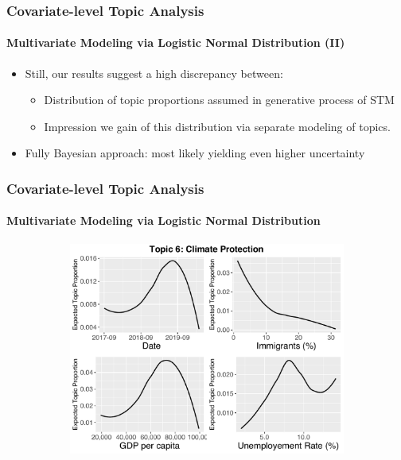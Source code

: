 \documentclass[xcolor=dvipsnames]{beamer}
\begin{document}
\begin{frame}
\frametitle{Covariate-level Topic Analysis}
\framesubtitle{Multivariate Modeling via Logistic Normal Distribution (II)}
\begin{itemize}
\item Still, our results suggest a high discrepancy between:
\begin{itemize}
\item Distribution of topic proportions assumed in generative process of STM
\item Impression we gain of this distribution via separate modeling of topics.
\end{itemize}
\item Fully Bayesian approach: most likely yielding even higher uncertainty
\end{itemize}
\frametitle{Covariate-level Topic Analysis}
\framesubtitle{Multivariate Modeling via Logistic Normal Distribution}
\begin{figure}[h!]
  \centering
  \captionsetup{justification=centering}
  \begin{subfigure}[b]{0.4\linewidth}
    \includegraphics[width=\linewidth]{../plots/presentation/direct_t6_without_credible.pdf}
  \end{subfigure}
  \begin{subfigure}[b]{0.4\linewidth}

\end{subfigure}
\end{figure}
\end{frame}
\end{document}
